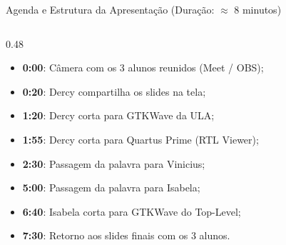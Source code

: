 \documentclass[aspectratio=169, 10pt]{beamer}
\begin{document}
\begin{frame}{Agenda e Estrutura da Apresentação (Duração: $\approx$ 8 minutos)}
\begin{columns}[T]
    \begin{column}{0.48\textwidth}
      \begin{tcolorbox}[cuebox]
        \scriptsize
        \begin{itemize}\setlength{\itemsep}{1pt}
          \item \textbf{0:00}: Câmera com os 3 alunos reunidos (Meet / OBS);
          \item \textbf{0:20}: Dercy compartilha os slides na tela;
          \item \textbf{1:20}: Dercy corta para GTKWave da ULA;
          \item \textbf{1:55}: Dercy corta para Quartus Prime (RTL Viewer);
          \item \textbf{2:30}: Passagem da palavra para Vinicius;
          \item \textbf{5:00}: Passagem da palavra para Isabela;
          \item \textbf{6:40}: Isabela corta para GTKWave do Top-Level;
          \item \textbf{7:30}: Retorno aos slides finais com os 3 alunos.
        \end{itemize}
      \end{tcolorbox}
    \end{column}
  \end{columns}
\end{frame}
\end{document}
